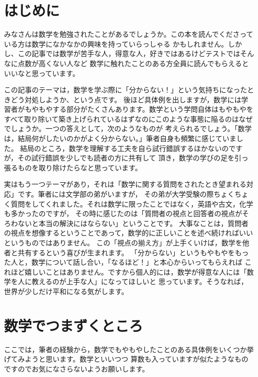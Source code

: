 \documentclass[./main]{subfiles}
\begin{document}

\section{はじめに}

みなさんは数学を勉強されたことがあるでしょうか。この本を読んでくださっている方は数学になかなかの興味を持っていらっしゃる
かもしれません。しかし、この記事では数学が苦手な人，得意な人，好きではあるけどテストではそんなに点数が高くない人など
数学に触れたことのある方全員に読んでもらえるといいなと思っています。

この記事のテーマは，数学を学ぶ際に「分からない！」という気持ちになったときどう対処しようか、という点です。
後ほど具体例を出しますが，数学には学習者がもやもやする部分がたくさんあります。数学という学問自体はもやもやを
すべて取り除いて築き上げられているはずなのにこのような事態に陥るのはなぜでしょうか。一つの答えとして，次のようなものが
考えられるでしょう。「数学は，結局何がしたいのかがよく分からない。」筆者自身も頻繁に感じていました。
結局のところ，数学を理解する工夫を自ら試行錯誤するほかないのですが，その試行錯誤を少しでも読者の方に共有して
頂き，数学の学びの足を引っ張るものを取り除けたらなと思っています。

実はもう一つテーマがあり，それは「数学に関する質問をされたとき望まれる対応」です。筆者には文学部の弟がいますが，
その弟が大学受験の際ちょくちょく質問をしてくれました。それは数学に限ったことではなく，英語や古文，化学も多かったのですが，
その時に感じたのは「質問者の視点と回答者の視点がそろわないと本当の解決にはならない」ということです。
大事なことは，質問者の視点を想像するということであって，数学的に正しいことを述べ続ければいいというものではありません。
この「視点の揃え方」が上手くいけば，数学を他者と共有するという喜びが生まれます。
「分からない」というもやもやをもった人と，数学について話し合い，「なるほど！」と本心からいってもらえれば
これほど嬉しいことはありません。ですから個人的には，数学が得意な人には「数学を人に教えるのが上手な人」になってほしいと
思っています。そうなれば，世界が少しだけ平和になる気がします。

\section{数学でつまずくところ}

ここでは，筆者の経験から，数学でもやもやしたことのある具体例をいくつか挙げてみようと思います。数学といいつつ
算数も入っていますが似たようなものですのでお気になさらないようお願いします。
\end{document}
